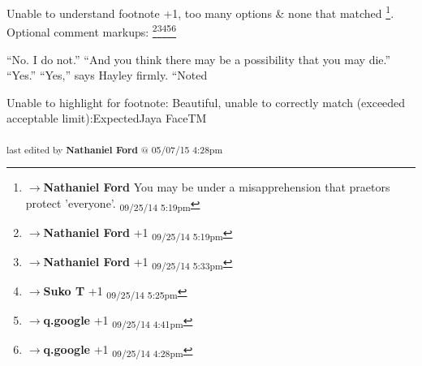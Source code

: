 	Unable to understand footnote +1, too many options & none that matched \footnote{$\rightarrow$\textbf{Nathaniel Ford }You may be under a misapprehension that praetors protect 'everyone'. \textsubscript{09/25/14 5:19pm}}. Optional comment markups: \footnote{$\rightarrow$\textbf{Nathaniel Ford }+1 \textsubscript{09/25/14 5:19pm}}\footnote{$\rightarrow$\textbf{Nathaniel Ford }+1 \textsubscript{09/25/14 5:33pm}}\footnote{$\rightarrow$\textbf{Suko T }+1 \textsubscript{09/25/14 5:25pm}}\footnote{$\rightarrow$\textbf{q.google }+1 \textsubscript{09/25/14 4:41pm}}\footnote{$\rightarrow$\textbf{q.google }+1 \textsubscript{09/25/14 4:28pm}} 

“No. I do not.”
“And you think there may be a possibility that you may die.”
“Yes.”
“Yes,” says Hayley firmly.
“Noted

	Unable to highlight for footnote: Beautiful, unable to correctly match (exceeded acceptable limit):ExpectedJaya FaceTM


\fi

\vspace{\fill}

\begin{flushright}
\textsubscript{last edited by \textbf{Nathaniel Ford} @ 05/07/15 4:28pm}
\end{flushright}

